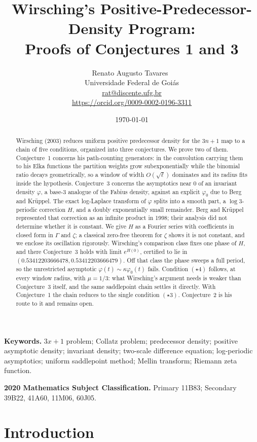 \documentclass[11pt]{article}
\title{Wirsching's Positive-Predecessor-Density Program:\\
Proofs of Conjectures 1 and 3}
\author{Renato Augusto Tavares~\orcidlink{0009-0002-0196-3311}\\
\normalsize Universidade Federal de Goi\'as\\
\small \href{mailto:rat@discente.ufg.br}{rat@discente.ufg.br}\\
\small \href{https://orcid.org/0009-0002-0196-3311}{https://orcid.org/0009-0002-0196-3311}}
\date{\today}
\theoremstyle{definition}
\theoremstyle{remark}
\begin{document}
\maketitle



\begin{abstract}
Wirsching (2003) reduces uniform positive predecessor density for the
$3n+1$ map to a chain of five conditions, organized into three
conjectures. We prove two of them. Conjecture~1 concerns his
path-counting generators: in the convolution carrying them to his Elka
functions the partition weights grow subexponentially while the
binomial ratio decays geometrically, so a window of width
$O(\sqrt\ell)$ dominates and its radius fits inside the hypothesis.
Conjecture~3 concerns the asymptotics near $0$ of an invariant density
$\varphi$, a base-$3$ analogue of the Fabius density, against an
explicit $\varphi_0$ due to Berg and Kr\"uppel. The exact log-Laplace
transform of $\varphi$ splits into a smooth part, a $\log3$-periodic
correction $H$, and a doubly exponentially small remainder. Berg and
Kr\"uppel represented that correction as an infinite product in 1998;
their analysis did not determine whether it is constant. We give $H$ as a Fourier series with
coefficients in closed form in $\Gamma$ and $\zeta$; a classical
zero-free theorem for $\zeta$ shows it is not constant, and we enclose
its oscillation rigorously. Wirsching's comparison class fixes one
phase of $H$, and there Conjecture~3 holds with limit $e^{H(0)}$,
certified to lie in $(0.53412203666478,0.53412203666479)$. Off that class the phase sweeps a full
period, so the unrestricted asymptotic
$\varphi(t)\sim\kappa\varphi_0(t)$ fails. Condition $(\star4)$ follows, at every window radius, with $\mu=1/3$:
what Wirsching's argument needs is weaker than Conjecture~3 itself, and
the same saddlepoint chain settles it directly. With Conjecture~1 the
chain reduces to the single condition $(\star3)$. Conjecture~2 is his route to it and remains open.
\end{abstract}

\noindent\textbf{Keywords.} $3x+1$ problem; Collatz problem; predecessor
density; positive asymptotic density; invariant density; two-scale
difference equation; log-periodic asymptotics; uniform saddlepoint
method; Mellin transform; Riemann zeta function.

\smallskip
\noindent\textbf{2020 Mathematics Subject Classification.} Primary
11B83; Secondary 39B22, 41A60, 11M06, 60J05.

\section{Introduction}
\label{sec:intro}
\end{document}
